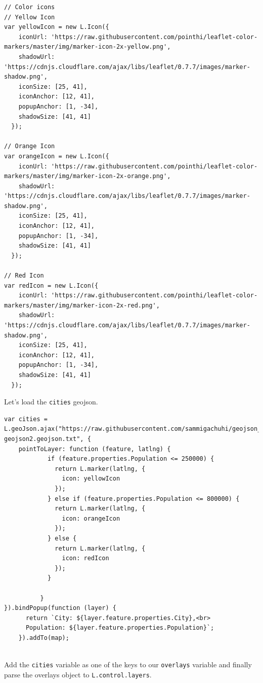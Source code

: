 \documentclass[
]{book}
\begin{document}
\begin{verbatim}
// Color icons
// Yellow Icon
var yellowIcon = new L.Icon({
    iconUrl: 'https://raw.githubusercontent.com/pointhi/leaflet-color-markers/master/img/marker-icon-2x-yellow.png',
    shadowUrl: 'https://cdnjs.cloudflare.com/ajax/libs/leaflet/0.7.7/images/marker-shadow.png',
    iconSize: [25, 41],
    iconAnchor: [12, 41],
    popupAnchor: [1, -34],
    shadowSize: [41, 41]
  });

// Orange Icon
var orangeIcon = new L.Icon({
    iconUrl: 'https://raw.githubusercontent.com/pointhi/leaflet-color-markers/master/img/marker-icon-2x-orange.png',
    shadowUrl: 'https://cdnjs.cloudflare.com/ajax/libs/leaflet/0.7.7/images/marker-shadow.png',
    iconSize: [25, 41],
    iconAnchor: [12, 41],
    popupAnchor: [1, -34],
    shadowSize: [41, 41]
  });

// Red Icon
var redIcon = new L.Icon({
    iconUrl: 'https://raw.githubusercontent.com/pointhi/leaflet-color-markers/master/img/marker-icon-2x-red.png',
    shadowUrl: 'https://cdnjs.cloudflare.com/ajax/libs/leaflet/0.7.7/images/marker-shadow.png',
    iconSize: [25, 41],
    iconAnchor: [12, 41],
    popupAnchor: [1, -34],
    shadowSize: [41, 41]
  });
\end{verbatim}

Let's load the \texttt{cities} geojson.

\begin{verbatim}
var cities = L.geoJson.ajax("https://raw.githubusercontent.com/sammigachuhi/geojson_files/main/cities-geojson2.geojson.txt", {
    pointToLayer: function (feature, latlng) {
            if (feature.properties.Population <= 250000) {
              return L.marker(latlng, {
                icon: yellowIcon 
              });
            } else if (feature.properties.Population <= 800000) {
              return L.marker(latlng, {
                icon: orangeIcon 
              });
            } else {
              return L.marker(latlng, {
                icon: redIcon 
              });
            }
            
          }
}).bindPopup(function (layer) {
      return `City: ${layer.feature.properties.City},<br>
      Population: ${layer.feature.properties.Population}`;
    }).addTo(map);
    
\end{verbatim}

Add the \texttt{cities} variable as one of the keys to our \texttt{overlays} variable and finally parse the overlays object to \texttt{L.control.layers}.
\end{document}
